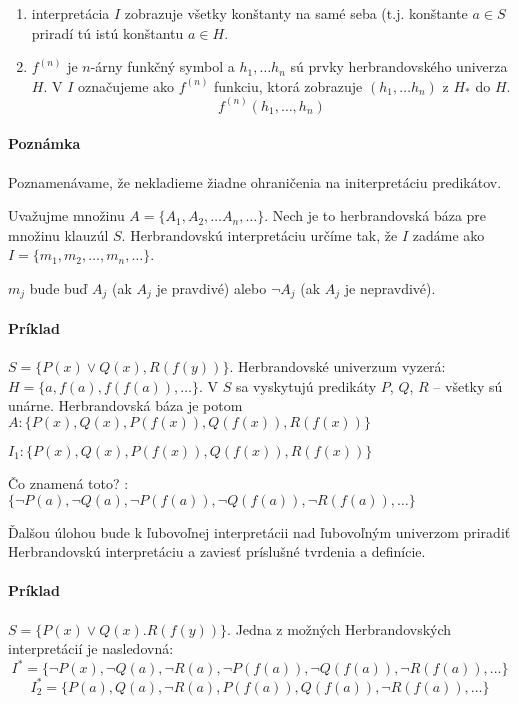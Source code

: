 \begin{enumerate}
	\item interpretácia $I$ zobrazuje všetky konštanty na samé seba (t.j.
	konštante $a \in S$ priradí tú istú konštantu $a \in H$.
	\item $f^{(n)}$ je $n$-árny funkčný symbol a $h_1, \ldots h_n$ sú prvky
	herbrandovského univerza $H$. V $I$ označujeme ako $f^{(n)}$ funkciu,
	ktorá zobrazuje $(h_1, \ldots h_n)$ z $H_*$ do $H$. $$f^{(n)}(h_1,
	\ldots, h_n)$$
\end{enumerate}

\paragraph{Poznámka} Poznamenávame, že nekladieme žiadne ohraničenia na initerpretáciu predikátov.

Uvažujme množinu $A = \{ A_1, A_2, \ldots A_n, \ldots \}$. Nech je to
herbrandovská báza pre množinu klauzúl $S$. Herbrandovskú interpretáciu určíme
tak, že  $I$ zadáme ako $I=\{ m_1, m_2, \ldots, m_n, \ldots \}$. 

\par $m_j$ bude buď $A_j$ (ak $A_j$ je pravdivé) alebo $\neg A_j$ (ak $A_j$ je
nepravdivé).

\paragraph{Príklad} $S=\{ P(x) \lor Q(x), R(f(y)) \}$. Herbrandovské univerzum
vyzerá: $H=\{a, f(a), f(f(a)), \ldots \}$. V $S$ sa vyskytujú predikáty $P$,
$Q$, $R$ --  všetky sú unárne. Herbrandovská báza je potom $A: \{ P(x), Q(x),
 P(f(x)), Q(f(x)), R(f(x)) \}$
 
$I_1: \{ P(x), Q(x), P(f(x)), Q(f(x)), R(f(x)) \}$

Čo znamená toto? :
$  \{ \neg P(a), \neg Q(a), \neg P(f(a)), \neg Q(f(a)), \neg R(f(a)), \ldots \}$


Ďalšou úlohou bude k ľubovoľnej interpretácii nad ľubovoľným univerzom
priradiť Herbrandovskú interpretáciu a zaviesť príslušné tvrdenia a definície.

\paragraph{Príklad} $S=\{ P(x) \lor Q(x). R(f(y)) \}$.  Jedna z možných
Herbrandovských interpretácií je nasledovná:
$$ I^* = \{ \neg P(x), \neg Q(a), \neg R(a), \neg P(f(a)), \neg Q(f(a)), \neg
R(f(a)), \ldots \}$$
$$ I_2^* = \{ P(a), Q(a), \neg R(a), P(f(a)), Q(f(a)), \neg R(f(a)), \ldots \}$$

